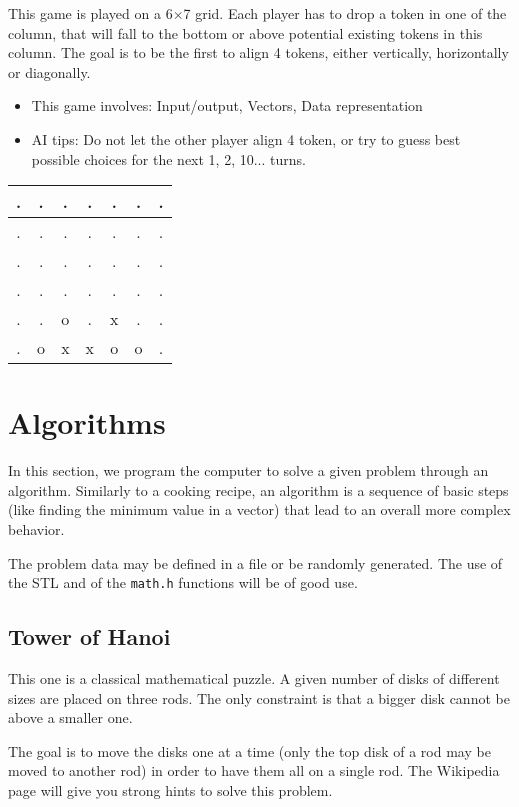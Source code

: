 \documentclass{ecnreport}
\begin{document}
This game is played on a 6$\times$7 grid. Each player has to drop a token in one of the column, that will fall to the bottom or above potential existing tokens in this column.
The goal is to be the first to align 4 tokens, either vertically, horizontally or diagonally.
\begin{itemize}
 \item This game involves: Input/output, Vectors, Data representation
 \item AI tips: Do not let the other player align 4 token, or try to guess best possible choices for the next 1, 2, 10... turns.
\end{itemize}
\begin{center}
 \begin{tabular}{|c|c|c|c|c|c|c|}
 \hline  
 . &.&.&.&. &.&.\\\hline
 . &.&.&.&. &.&.\\\hline
 . &.&.&.&. &.&.\\\hline
 . &.&.&.&. &.&.\\\hline
 . &.&o&.&x &.&.\\\hline
 . &o&x&x&o &o&.\\\hline
 \end{tabular}
\end{center}


\section{Algorithms}

In this section, we program the computer to solve a given problem through an algorithm. Similarly to a cooking recipe, an algorithm is a sequence of basic steps (like finding the minimum value in a vector) that lead to an overall more complex behavior.

The problem data may be defined in a file or be randomly generated.
The use of the STL and of the \texttt{math.h} functions will be of good use. 

\subsection{Tower of Hanoi}

This one is a classical mathematical puzzle.
A given number of disks of different sizes are placed on three rods.
The only constraint is that a bigger disk cannot be above a smaller one. 

The goal is to move the disks one at a time (only the top disk of a rod may be moved to another rod) in order to have them all on a single rod.
The Wikipedia page will give you strong hints to solve this problem.
\end{document}
